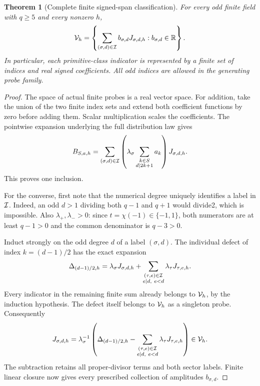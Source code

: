 \documentclass[11pt]{article}
\newtheorem{theorem}{Theorem}[section]
\begin{document}
\begin{theorem}[Complete finite signed-span classification]
\label{thm:odd-pell-signed-span}
For every odd finite field with \(q\ge5\) and every nonzero \(h\),
\[
 {\cal V}_h=
 \left\{\sum_{(\sigma,d)\in{\cal I}}
              b_{\sigma,d}J_{\sigma,d,h}:
                   b_{\sigma,d}\in\mathbb R\right\}.
\]
In particular, each primitive-class indicator is represented by
a finite set of indices and real signed coefficients.
All odd indices are allowed in the generating probe family.
\end{theorem}

\begin{proof}
The space of actual finite probes is a real vector space.
For addition, take the union of the two finite index sets and
extend both coefficient functions by zero before adding them.
Scalar multiplication scales the coefficients.
The pointwise expansion underlying the full distribution law gives
\[
 B_{S,a,h}=
 \sum_{(\sigma,d)\in{\cal I}}
     \left(\lambda_\sigma
         \sum_{\substack{k\in S\\d\mid 2k+1}}a_k\right)
               J_{\sigma,d,h}.
\]
This proves one inclusion.

For the converse, first note that the numerical degree uniquely
identifies a label in \({\cal I}\). Indeed, an odd \(d>1\) dividing
both \(q-1\) and \(q+1\) would divide2, which is impossible.
Also \(\lambda_+,\lambda_->0\): since \(t=\chi(-1)\in\{-1,1\}\),
both numerators are at least \(q-1>0\) and the common denominator
is \(q-3>0\).

Induct strongly on the odd degree \(d\) of a label \((\sigma,d)\).
The individual defect of index \(k=(d-1)/2\) has the exact expansion
\[
 \Delta_{(d-1)/2,h}
   =\lambda_\sigma J_{\sigma,d,h}
    +\sum_{\substack{(\tau,e)\in{\cal I}\\e\mid d,\ e<d}}
                     \lambda_\tau J_{\tau,e,h}.
\]
Every indicator in the remaining finite sum already belongs to
\({\cal V}_h\), by the induction hypothesis.
The defect itself belongs to \({\cal V}_h\) as a singleton probe.
Consequently
\[
 J_{\sigma,d,h}
   =\lambda_\sigma^{-1}
       \left(\Delta_{(d-1)/2,h}
        -\sum_{\substack{(\tau,e)\in{\cal I}\\e\mid d,\ e<d}}
                     \lambda_\tau J_{\tau,e,h}\right)
       \in{\cal V}_h.
\]
The subtraction retains all proper-divisor terms and both
sector labels. Finite linear closure now gives every prescribed
collection of amplitudes \(b_{\sigma,d}\).
\end{proof}
\end{document}

